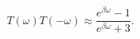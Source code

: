 \begin{equation}
T(\omega) T(-\omega) \approx \frac{e^{\beta \omega} - 1}{e^{\beta \omega} + 3}.
\end{equation}

